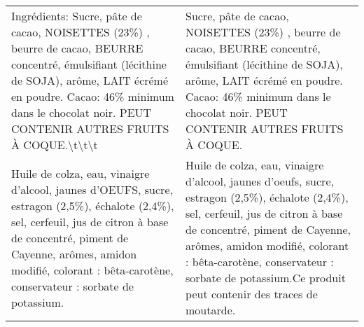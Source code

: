 \begin{tabular}{p{7cm}p{7cm}}
                                                                                                                                                                                                                                                                                                                                                                                                                                                                                                                                                                   Ingrédients: Sucre, pâte de cacao, NOISETTES (23\%) , beurre de cacao, BEURRE concentré, émulsifiant (lécithine de SOJA), arôme, LAIT écrémé en poudre. Cacao: 46\% minimum dans le chocolat noir. PEUT CONTENIR AUTRES FRUITS À COQUE.\textbackslash t\textbackslash t\textbackslash t\newline  &                                                                                                                                                                                                                                                                                                                                                                                                                                                                                                                                                                                   Sucre, pâte de cacao, NOISETTES (23\%) , beurre de cacao, BEURRE concentré, émulsifiant (lécithine de SOJA), arôme, LAIT écrémé en poudre. Cacao: 46\% minimum dans le chocolat noir. PEUT CONTENIR AUTRES FRUITS À COQUE. \\
                                                                                                                                                                                                                                                                                                                                                                                                                                                                                                                                                    Huile de colza, eau, vinaigre d'alcool, jaunes d'OEUFS, sucre, estragon (2,5\%), échalote (2,4\%), sel, cerfeuil, jus de citron à base de concentré, piment de Cayenne, arômes, amidon modifié, colorant : bêta-carotène, conservateur : sorbate de potassium. &                                                                                                                                                                                                                                                                                                                                                                                                                                                                                               Huile de colza, eau, vinaigre d'alcool, jaunes d'oeufs, sucre, estragon (2,5\%), échalote (2,4\%), sel, cerfeuil, jus de citron à base de concentré, piment de Cayenne, arômes, amidon modifié, colorant : bêta-carotène, conservateur : sorbate de potassium.Ce produit peut contenir des traces de moutarde. \\
\bottomrule
\end{tabular}
